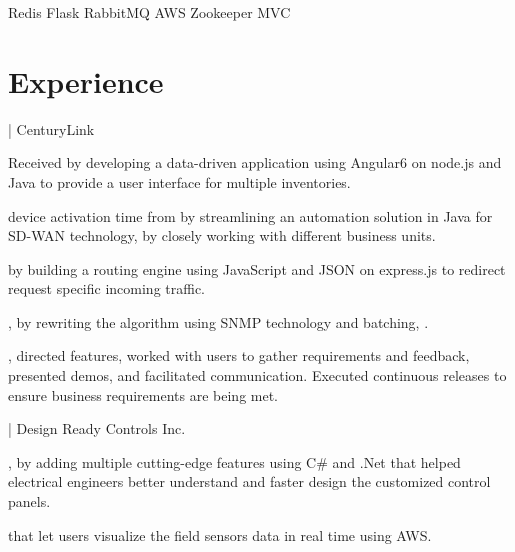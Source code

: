 \documentclass[]{rinkal_resume}
\begin{document}
  \textbullet{} 
Redis \textbullet{} 
Flask \textbullet{} 
RabbitMQ \textbullet{}  
AWS \textbullet{} 
Zookeeper \textbullet{} 
MVC 
\smallsectionsep


\section{Experience}
 | CenturyLink\hfill\   
\vspace{2pt}
\begin{tightemize}
\item Received  by developing a data-driven application using Angular6 on node.js and Java to provide a user interface for multiple inventories. 
\item {} device activation time from  by streamlining an automation solution in Java for SD-WAN technology, by closely working with different business units.
\item {} by building a routing engine using JavaScript and JSON on express.js to redirect request specific incoming traffic.
\item {}, by rewriting the algorithm using SNMP technology and batching, .
\item {}, directed features, worked with users to gather requirements and feedback, presented demos, and facilitated communication. Executed continuous releases to ensure business requirements are being met.
\end{tightemize}
\sectionsep

 | Design Ready Controls Inc. \hfill {}
\vspace{2pt}
\begin{tightemize}
\vspace{1pt}
\item {}, by adding multiple cutting-edge features using C\# and .Net that helped electrical engineers better understand and faster design the customized control panels.
\item {} that let users visualize the field sensors data in real time using AWS.
\end{tightemize}
\smallsectionsep
\end{document}
